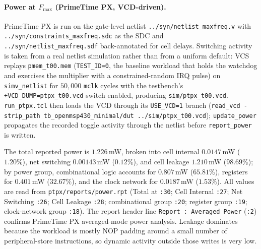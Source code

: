 \paragraph{Power at $F_\mathrm{max}$ (PrimeTime PX, VCD-driven).}
PrimeTime PX is run on the gate-level netlist
\texttt{../syn/netlist\_maxfreq.v} with
\texttt{../syn/constraints\_maxfreq.sdc} as the SDC and
\texttt{../syn/netlist\_maxfreq.sdf} back-annotated for cell delays.
Switching activity is taken from a real netlist simulation rather than
from a uniform default: VCS replays \texttt{pmem\_t00.mem}
(\texttt{TEST\_ID=0}, the baseline workload that holds the watchdog
and exercises the multiplier with a constrained-random IRQ pulse) on
\texttt{simv\_netlist} for $50{,}000$ \texttt{mclk} cycles with the
testbench's \verb|+VCD_DUMP=ptpx_t00.vcd| switch enabled, producing
\texttt{sim/ptpx\_t00.vcd}. \texttt{run\_ptpx.tcl} then loads the VCD
through its \texttt{USE\_VCD=1} branch
(\texttt{read\_vcd -strip\_path tb\_openmsp430\_minimal/dut
../sim/ptpx\_t00.vcd}); \texttt{update\_power} propagates the recorded
toggle activity through the netlist before \texttt{report\_power} is
written.

The total reported power is $1.226$\,mW, broken into cell internal
$0.0147$\,mW ($1.20\%$), net switching $0.00143$\,mW ($0.12\%$), and
cell leakage $1.210$\,mW ($98.69\%$); by power group, combinational
logic accounts for $0.807$\,mW ($65.81\%$), registers for $0.401$\,mW
($32.67\%$), and the clock network for $0.0187$\,mW ($1.53\%$). All
values are read from \texttt{ptpx/reports/power.rpt} (Total at
\texttt{:30}; Cell Internal \texttt{:27}; Net Switching \texttt{:26};
Cell Leakage \texttt{:28}; combinational group \texttt{:20};
register group \texttt{:19}; clock-network group \texttt{:18}). The
report header line \texttt{Report : Averaged Power} (\texttt{:2})
confirms PrimeTime PX averaged-mode power analysis. Leakage dominates
because the workload is mostly NOP padding around a small number of
peripheral-store instructions, so dynamic activity outside those writes
is very low.
